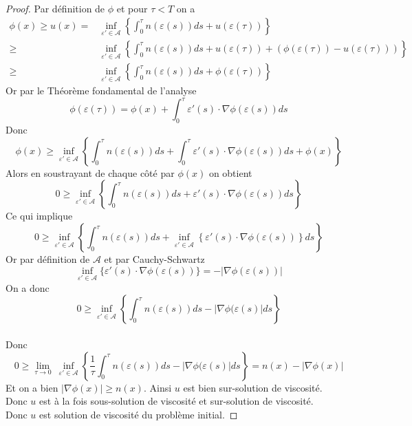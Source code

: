 \begin{proof}
Par définition de $\phi$ et pour $\tau<T$ on a 
\begin{equation*}
    \begin{split}
        \phi(x)\ge u(x)=&
    \underset{\varepsilon'\in \mathcal{A}}{\inf}\left\{\int^{\tau}_0 n(\varepsilon(s))ds+u(\varepsilon(\tau))\right\}\\
    \ge&
    \underset{\varepsilon'\in \mathcal{A}}{\inf}\left\{\int^{\tau}_0 n(\varepsilon(s))ds+u(\varepsilon(\tau))+ (\phi(\varepsilon(\tau))-u(\varepsilon(\tau)))\right\}\\
    \ge&
    \underset{\varepsilon'\in \mathcal{A}}{\inf}\left\{\int^{\tau}_0 n(\varepsilon(s))ds+\phi(\varepsilon(\tau))\right\}
    \end{split}
\end{equation*}
Or par le Théorème fondamental de l'analyse 
\begin{equation*}
    \phi(\varepsilon(\tau))=\phi(x)+\int^\tau_0 \varepsilon'(s)\cdot\nabla\phi(\varepsilon(s))ds
\end{equation*}
Donc
\begin{equation*}
    \phi(x)\ge\underset{\varepsilon'\in \mathcal{A}}{\inf}\left\{\int^{\tau}_0 n(\varepsilon(s))ds+\int^\tau_0 \varepsilon'(s)\cdot\nabla\phi(\varepsilon(s))ds +\phi(x)\right\}
\end{equation*}
Alors en soustrayant de chaque côté par $\phi(x)$ on obtient
\begin{equation*}
    0\ge\underset{\varepsilon'\in \mathcal{A}}{\inf}\left\{\int^{\tau}_0 n(\varepsilon(s))ds+ \varepsilon'(s)\cdot\nabla\phi(\varepsilon(s))ds\right\}
\end{equation*}
Ce qui implique
\begin{equation*}
    0\ge\underset{\varepsilon'\in \mathcal{A}}{\inf}\left\{\int^{\tau}_0 n(\varepsilon(s))ds+ \underset{\varepsilon'\in \mathcal{A}}{\inf}\left\{\varepsilon'(s)\cdot\nabla\phi(\varepsilon(s))\right\}ds\right\}
\end{equation*}
Or par définition de $\mathcal{A}$ et par Cauchy-Schwartz
\begin{equation*}
    \underset{\varepsilon'\in \mathcal{A}}{\inf}\{\varepsilon'(s)\cdot\nabla\phi(\varepsilon(s))\}=-|\nabla\phi(\varepsilon(s))|
\end{equation*}
On a donc
\begin{equation*}
    0\ge\underset{\varepsilon'\in \mathcal{A}}{\inf}\left\{\int^{\tau}_0 n(\varepsilon(s))ds -|\nabla\phi(\varepsilon(s)|ds\right\}
\end{equation*}\\
Donc 
\begin{equation*}
    0\ge \underset{\tau\longrightarrow 0}{\lim} \ \underset{\varepsilon'\in \mathcal{A}}{\inf}\left\{ \frac{1}{\tau}\int^{\tau}_0 n(\varepsilon(s))ds -|\nabla\phi(\varepsilon(s)|ds\right\} = n(x)-|\nabla\phi(x)|
\end{equation*}
Et on a bien $|\nabla \phi(x)|\ge n(x)$. Ainsi $u$ est bien sur-solution de viscosité. \\
Donc $u$ est à la fois sous-solution de viscosité et sur-solution de viscosité.\\
Donc $u$ est solution de viscosité du problème initial.
\end{proof}
